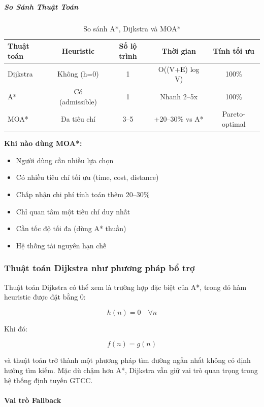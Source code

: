 \subparagraph{So Sánh Thuật Toán}

\begin{table}[h]
\centering
\begin{tabular}{|l|c|c|c|c|}
\hline
\textbf{Thuật toán} & \textbf{Heuristic} & \textbf{Số lộ trình} & \textbf{Thời gian} & \textbf{Tính tối ưu} \\
\hline
Dijkstra & Không (h=0) & 1 & O((V+E) log V) & 100\% \\
A* & Có (admissible) & 1 & Nhanh 2--5x & 100\% \\
MOA* & Đa tiêu chí & 3--5 & +20--30\% vs A* & Pareto-optimal \\
\hline
\end{tabular}
\caption{So sánh A*, Dijkstra và MOA*}
\end{table}

\textbf{Khi nào dùng MOA*:}

\begin{itemize}
    \item[$\checkmark$] Người dùng cần nhiều lựa chọn
    \item[$\checkmark$] Có nhiều tiêu chí tối ưu (time, cost, distance)
    \item[$\checkmark$] Chấp nhận chi phí tính toán thêm 20--30\%
    \item[$\times$] Chỉ quan tâm một tiêu chí duy nhất
    \item[$\times$] Cần tốc độ tối đa (dùng A* thuần)
    \item[$\times$] Hệ thống tài nguyên hạn chế
\end{itemize}

\subsubsection{Thuật toán Dijkstra như phương pháp bổ trợ}

Thuật toán Dijkstra có thể xem là trường hợp đặc biệt của A*, trong đó hàm heuristic được đặt bằng 0:

\[
h(n) = 0 \quad \forall n
\]

Khi đó:

\[
f(n) = g(n)
\]

và thuật toán trở thành một phương pháp tìm đường ngắn nhất không có định hướng tìm kiếm. Mặc dù chậm hơn A*, Dijkstra vẫn giữ vai trò quan trọng trong hệ thống định tuyến GTCC.

\paragraph{Vai trò Fallback}

